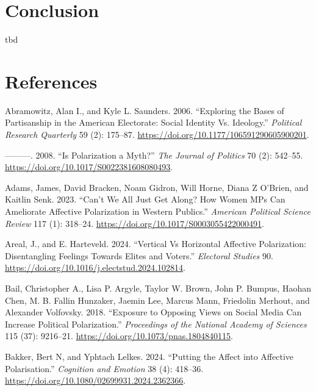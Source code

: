 \documentclass[
  12pt,
  a4paper,
  DIV=11,
  numbers=noendperiod]{scrartcl}
\newlength{\cslhangindent}
\newenvironment{CSLReferences}[2] %
 {\begin{list}{}{%
  \setlength{\itemindent}{0pt}
  \setlength{\leftmargin}{0pt}
  \setlength{\parsep}{0pt}
  \ifodd #1
   \setlength{\leftmargin}{\cslhangindent}
   \setlength{\itemindent}{-1\cslhangindent}
  \fi
  \setlength{\itemsep}{#2\baselineskip}}}
 {\end{list}}
\begin{document}
\section{Conclusion}\label{conclusion}

tbd

\singlespacing

\section{References}\label{references}

\label{refs}
\begin{CSLReferences}{1}{0}
Abramowitz, Alan I., and Kyle L. Saunders. 2006. {``Exploring the Bases
of Partisanship in the American Electorate: Social Identity Vs.
Ideology.''} \emph{Political Research Quarterly} 59 (2): 175--87.
\url{https://doi.org/10.1177/106591290605900201}.

---------. 2008. {``Is Polarization a Myth?''} \emph{The Journal of
Politics} 70 (2): 542--55.
\url{https://doi.org/10.1017/S0022381608080493}.

Adams, James, David Bracken, Noam Gidron, Will Horne, Diana Z O'Brien,
and Kaitlin Senk. 2023. {``Can't We All Just Get Along? How Women MPs
Can Ameliorate Affective Polarization in Western Publics.''}
\emph{American Political Science Review} 117 (1): 318--24.
\url{https://doi.org/10.1017/S0003055422000491}.

Areal, J., and E. Harteveld. 2024. {``Vertical Vs Horizontal Affective
Polarization: Disentangling Feelings Towards Elites and Voters.''}
\emph{Electoral Studies} 90.
\url{https://doi.org/10.1016/j.electstud.2024.102814}.

Bail, Christopher A., Lisa P. Argyle, Taylor W. Brown, John P. Bumpus,
Haohan Chen, M. B. Fallin Hunzaker, Jaemin Lee, Marcus Mann, Friedolin
Merhout, and Alexander Volfovsky. 2018. {``Exposure to Opposing Views on
Social Media Can Increase Political Polarization.''} \emph{Proceedings
of the National Academy of Sciences} 115 (37): 9216--21.
\url{https://doi.org/10.1073/pnas.1804840115}.

Bakker, Bert N, and Yphtach Lelkes. 2024. {``Putting the Affect into
Affective Polarisation.''} \emph{Cognition and Emotion} 38 (4): 418--36.
\url{https://doi.org/10.1080/02699931.2024.2362366}.


\end{CSLReferences}
\end{document}
